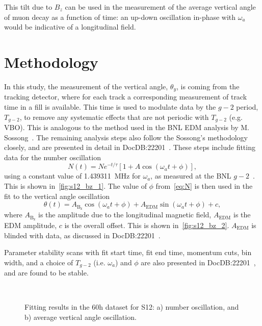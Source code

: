 \documentclass[12pt]{article}
\begin{document}
This tilt due to $B_z$ can be used in the measurement of the average vertical angle of muon decay as a function of time: an up-down oscillation in-phase with $\omega_a$ would be indicative of a longitudinal field.

\clearpage
\thispagestyle{plain}

\section{Methodology}
In this study, the measurement of the vertical angle, $\theta_y$, is coming from the tracking detector, where for each track a corresponding measurement of track time in a fill is available. This time is used to modulate data by the $g-2$ period, $T_{g-2}$, to remove any systematic effects that are not periodic with $T_{g-2}$ (e.g. VBO). This is analogous to the method used in the BNL EDM analysis by M. Sossong~\cite{Sossong}. The remaining analysis steps also follow the Sossong's methodology closely, and are presented in detail in DocDB:22201~\cite{Gleb_docdb}. These steps include fitting data for the number oscillation
\begin{equation}
     N(t)=Ne^{-t/\tau}[1+A\cos(\omega_at+\phi)],
     \label{eq:N}
\end{equation}
using a constant value of \SI{1.439311}{\MHz} for $\omega_a$, as measured at the BNL $g-2$~\cite{BNL_AMM}. This is shown in~\cref{fig:s12_bz_1}. The value of $\phi$ from~\cref{eq:N} is then used in the fit to the vertical angle oscillation
\begin{equation}
    \theta(t) =  A_{\mathrm{B_z}}\cos(\omega_a t + \phi) + A_{\mathrm{EDM}}\sin(\omega_a t + \phi) + c,
\end{equation}
where $A_{\mathrm{B_z}}$ is the amplitude due to the longitudinal magnetic field, $A_{\mathrm{EDM}}$ is the EDM amplitude, $c$ is the overall offset. This is shown in~\cref{fig:s12_bz_2}. $A_{\mathrm{EDM}}$ is blinded with data, as discussed in DocDB:22201~\cite{Gleb_docdb}.

Parameter stability scans with fit start time, fit end time, momentum cuts, bin width, and a choice of $T_{g-2}$ (i.e. $\omega_a$) and $\phi$ are also presented in DocDB:22201~\cite{Gleb_docdb}, and are found to be stable.
\clearpage
\thispagestyle{plain} 

\begin{figure}[htpb]
    \centering
     \\ 
    \vspace{-0.2cm}
    \caption{Fitting results in the 60h dataset for S12: a) number oscillation, and b) average vertical angle oscillation.}
    \label{fig:s12_bz}
\end{figure}
\end{document}
